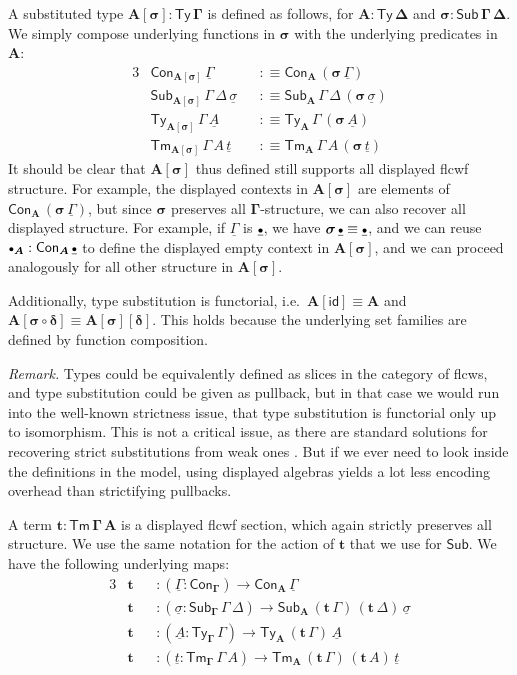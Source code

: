 \documentclass[12pt,a4paper,twoside,openany]{book}
\theoremstyle{remark}
\theoremstyle{definition}
\theoremstyle{theorem}
\newcommand{\bs}[1]{\boldsymbol{#1}}
\newcommand{\id}{\mathsf{id}}
\newcommand{\Con}{\mathsf{Con}}
\newcommand{\Sub}{\mathsf{Sub}}
\newcommand{\Tm}{\mathsf{Tm}}
\newcommand{\Ty}{\mathsf{Ty}}
\newcommand{\emptycon}{\scaleobj{.75}\bullet}
\newcommand{\bSub}{\bs{\Sub}}
\newcommand{\bGamma}{\bs{\Gamma}}
\newcommand{\bsigma}{\bs{\sigma}}
\newcommand{\bt}{\bs{t}}
\newcommand{\bA}{\bs{A}}
\newcommand{\ul}[1]{\underline{#1}}
\newcommand{\ulGamma}{\ul{\Gamma}}
\newcommand{\ulsigma}{\ul{\sigma}}
\newcommand{\ult}{\ul{t}}
\newcommand{\ulA}{\ul{A}}
\newcommand{\defn}{:\equiv}
\begin{document}
A substituted type $\bs{A[\sigma] : \Ty\,\Gamma}$ is defined as follows, for
$\bs{A : \Ty\,\Delta}$ and $\bs{\sigma : \Sub\,\Gamma\,\Delta}$. We simply compose
underlying functions in $\bsigma$ with the underlying predicates in $\bA$:
\begin{alignat*}{3}
  & \Con_{\bs{A[\sigma]}}\,\ulGamma && \defn \Con_{\bA}\,(\bsigma\,\ulGamma)\\
  & \Sub_{\bs{A[\sigma]}}\,\Gamma\,\Delta\,\ulsigma && \defn
    \Sub_{\bA}\,\Gamma\,\Delta\,(\bsigma\,\ulsigma)\\
  & \Ty_{\bs{A[\sigma]}}\,\Gamma\,\ulA && \defn
      \Ty_{\bA}\,\Gamma\,(\bsigma\,\ulA)\\
  & \Tm_{\bs{A[\sigma]}}\,\Gamma\,A\,\ult && \defn
      \Tm_{\bA}\,\Gamma\,A\,(\bsigma\,\ult)
\end{alignat*}
It should be clear that $\bs{A[\sigma]}$ thus defined still supports all
displayed flcwf structure. For example, the displayed contexts in
$\bs{A[\sigma]}$ are elements of $\Con_{\bA}\,(\bsigma\,\ulGamma)$, but since
$\bsigma$ preserves all $\bGamma$-structure, we can also recover all displayed
structure. For example, if $\ulGamma$ is $\ul{\emptycon}$, we have
$\bsigma\,\ul{\emptycon} \equiv \ul{\emptycon}$, and we can reuse
$\emptycon_{\bA} : \Con_{\bA}\,\ul{\emptycon}$ to define the displayed empty
context in $\bs{A[\sigma]}$, and we can proceed analogously for all other
structure in $\bs{A[\sigma]}$.

Additionally, type substitution is functorial, i.e.\ $\bs{A[\id]} \equiv \bA$
and $\bs{A[\sigma \circ \delta]} \equiv \bs{A[\sigma][\delta]}$. This holds
because the underlying set families are defined by function composition.

\emph{Remark.} Types could be equivalently defined as slices in the category of
flcws, and type substitution could be given as pullback, but in that case we
would run into the well-known strictness issue, that type substitution is
functorial only up to isomorphism. This is not a critical issue, as there are
standard solutions for recovering strict substitutions from weak ones
\cite{kapulkin12simplicial,local-univ,clairambault2014biequivalence}. But if we
ever need to look inside the definitions in the model, using displayed algebras
yields a lot less encoding overhead than strictifying pullbacks.

A term $\bs{t : \Tm\,\Gamma\,A}$ is a displayed flcwf section, which again
strictly preserves all structure. We use the same notation for the action of
$\bt$ that we use for $\bSub$. We have the following underlying maps:
\begin{alignat*}{3}
  & \bt &&: (\ulGamma : \Con_{\bGamma}) \to \Con_{\bA}\,\ulGamma \\
  & \bt &&: (\ulsigma : \Sub_{\bGamma}\,\Gamma\,\Delta) \to
             \Sub_{\bA}\,(\bt\,\Gamma)\,(\bt\,\Delta)\,\ulsigma\\
  & \bt &&: (\ulA : \Ty_{\bGamma}\,\Gamma) \to \Ty_{\bA}\,(\bt\,\Gamma)\,\ulA\\
  & \bt &&: (\ult : \Tm_{\bGamma}\,\Gamma\,A) \to \Tm_{\bA}\,(\bt\,\Gamma)\,(\bt\,A)\,\ult
\end{alignat*}
\end{document}
